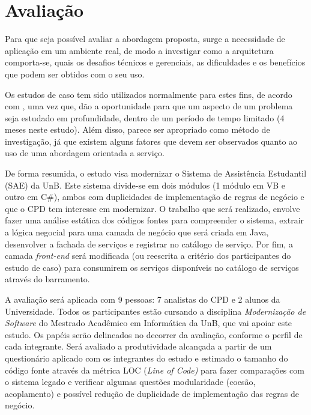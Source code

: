 \section{Avaliação}\label{estudo-empirico}

Para que seja possível avaliar a abordagem proposta, surge a necessidade de aplicação em um ambiente real, de modo a investigar como a arquitetura comporta-se, quais os desafios técnicos e gerenciais, as dificuldades e os benefícios que podem ser obtidos com o seu uso.

Os estudos de caso tem sido utilizados normalmente para estes fins, de acordo com \cite{runeson2012case}, uma vez que, dão a oportunidade para que um aspecto de um problema seja estudado em profundidade, dentro de um período de tempo limitado (4 meses neste estudo). Além disso, parece ser apropriado como método de investigação, já que existem alguns fatores que devem ser observados quanto ao uso de uma abordagem orientada a serviço.

De forma resumida, o estudo visa modernizar o Sistema de Assistência Estudantil  (SAE) da UnB. Este sistema divide-se em dois módulos (1 módulo em VB e outro em C\#), ambos com duplicidades de implementação de regras de negócio e que o CPD tem interesse em modernizar. O trabalho que será realizado, envolve fazer uma análise estática dos códigos fontes para compreender o sistema, extrair a lógica negocial para uma camada de negócio que será criada em Java, desenvolver a fachada de serviços e registrar no catálogo de serviço. Por fim, a camada \textit{front-end} será modificada (ou reescrita a critério dos participantes do estudo de caso) para consumirem os serviços disponíveis no catálogo de serviços através do barramento.

A avaliação será aplicada com 9 pessoas: 7 analistas do CPD e 2 alunos da Universidade. Todos os participantes estão cursando a disciplina \textit{Modernização de Software} do Mestrado Acadêmico em Informática da UnB, que vai apoiar este estudo. Os papéis serão delineados no decorrer da avaliação, conforme o perfil de cada integrante. Será avaliado a produtividade alcançada a partir de um questionário aplicado com os integrantes do estudo e estimado o tamanho do código fonte através da métrica LOC (\textit{Line of Code)} para fazer comparações com o sistema legado e verificar algumas questões modularidade (coesão, acoplamento) e possível redução de duplicidade de implementação das regras de negócio.



